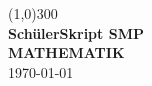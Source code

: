 \begin{titlepage}
	\begin{center}
	\line(1,0){300}  \\
	[0,5cm]
	\Huge{\bfseries SchülerSkript SMP} \\
	[3cm]
	\textsc{ \bfseries MATHEMATIK}  \\
	[15cm]
	\small{\today} \\
	[5cm]
	\end{center}
\end{titlepage}
